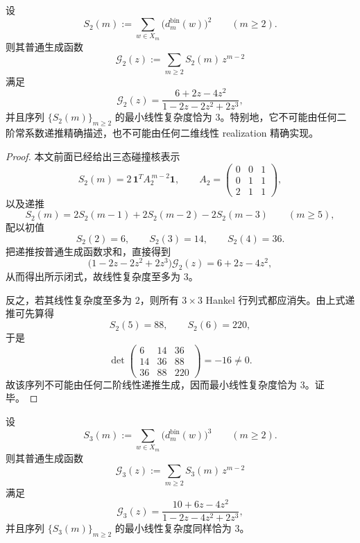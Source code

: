 \begin{theorem}[二阶碰撞核的最小线性复杂度]\label{thm:conclusion-foldbin-s2-minimal-linear-complexity-three}
设
\[
S_2(m):=\sum_{w\in X_m}\bigl(d_m^{\mathrm{bin}}(w)\bigr)^2
\qquad (m\ge 2).
\]
则其普通生成函数
\[
\mathcal G_2(z):=\sum_{m\ge 2}S_2(m)\,z^{m-2}
\]
满足
\[
\mathcal G_2(z)=\frac{6+2z-4z^2}{1-2z-2z^2+2z^3},
\]
并且序列 \(\{S_2(m)\}_{m\ge 2}\) 的最小线性复杂度恰为 \(3\)。特别地，它不可能由任何二阶常系数递推精确描述，也不可能由任何二维线性 realization 精确实现。
\end{theorem}

\begin{proof}
本文前面已经给出三态碰撞核表示
\[
S_2(m)=2\,\mathbf 1^{\!T}A_2^{\,m-2}\mathbf 1,
\qquad
A_2=
\begin{pmatrix}
0&0&1\\
0&1&1\\
2&1&1
\end{pmatrix},
\]
以及递推
\[
S_2(m)=2S_2(m-1)+2S_2(m-2)-2S_2(m-3)
\qquad (m\ge 5),
\]
配以初值
\[
S_2(2)=6,\qquad S_2(3)=14,\qquad S_2(4)=36.
\]
把递推按普通生成函数求和，直接得到
\[
\bigl(1-2z-2z^2+2z^3\bigr)\mathcal G_2(z)=6+2z-4z^2,
\]
从而得出所示闭式，故线性复杂度至多为 \(3\)。

反之，若其线性复杂度至多为 \(2\)，则所有 \(3\times 3\) Hankel 行列式都应消失。由上式递推可先算得
\[
S_2(5)=88,\qquad S_2(6)=220,
\]
于是
\[
\det
\begin{pmatrix}
6&14&36\\
14&36&88\\
36&88&220
\end{pmatrix}
=-16\neq 0.
\]
故该序列不可能由任何二阶线性递推生成，因而最小线性复杂度恰为 \(3\)。证毕。
\end{proof}

\begin{theorem}[三阶碰撞核的最小线性复杂度]\label{thm:conclusion-foldbin-s3-minimal-linear-complexity-three}
设
\[
S_3(m):=\sum_{w\in X_m}\bigl(d_m^{\mathrm{bin}}(w)\bigr)^3
\qquad (m\ge 2).
\]
则其普通生成函数
\[
\mathcal G_3(z):=\sum_{m\ge 2}S_3(m)\,z^{m-2}
\]
满足
\[
\mathcal G_3(z)=\frac{10+6z-4z^2}{1-2z-4z^2+2z^3},
\]
并且序列 \(\{S_3(m)\}_{m\ge 2}\) 的最小线性复杂度同样恰为 \(3\)。
\end{theorem}

